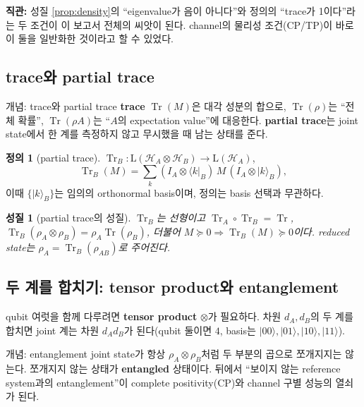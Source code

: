 \documentclass[11pt,a4paper]{article}
\newcommand{\Hcal}{\mathcal{H}}
\newcommand{\Tr}{\operatorname{Tr}}
\newcommand{\Lin}{\mathrm{L}}
\theoremstyle{definition}
\newtheorem{definition}{정의}[section]
\theoremstyle{plain}
\newtheorem{property}{성질}[section]
\theoremstyle{remark}
\begin{document}
\begin{intuitionbox}
\textbf{직관:} 성질 \ref{prop:density}의 ``eigenvalue가 음이 아니다''와 정의의 ``trace가 1이다''라는 두 조건이 이 보고서 전체의 씨앗이 된다. channel의 물리성 조건(CP/TP)이 바로 이 둘을 일반화한 것이라고 할 수 있었다.
\end{intuitionbox}

\subsection{trace와 partial trace}

\begin{conceptbox}{개념: trace와 partial trace}
\textbf{trace} $\Tr(M)$은 대각 성분의 합으로, $\Tr(\rho)$는 ``전체 확률'', $\Tr(\rho A)$는 ``$A$의 expectation value''에 대응한다. \textbf{partial trace}는 joint state에서 한 계를 측정하지 않고 무시했을 때 남는 상태를 준다.
\end{conceptbox}

\begin{definition}[partial trace]
$\Tr_B:\Lin(\Hcal_A\otimes\Hcal_B)\to\Lin(\Hcal_A)$,
\[
\Tr_B(M)=\sum_k(I_A\otimes\langle k|_B)\,M\,(I_A\otimes|k\rangle_B),
\]
이때 $\{|k\rangle_B\}$는 임의의 orthonormal basis이며, 정의는 basis 선택과 무관하다.
\end{definition}

\begin{property}[partial trace의 성질]\label{prop:ptrace}
$\Tr_B$는 선형이고 $\Tr_A\circ\Tr_B=\Tr$, $\Tr_B(\rho_A\otimes\rho_B)=\rho_A\Tr(\rho_B)$, 더불어 $M\succeq0\Rightarrow\Tr_B(M)\succeq0$이다. reduced state는 $\rho_A=\Tr_B(\rho_{AB})$로 주어진다.
\end{property}

\subsection{두 계를 합치기: tensor product와 entanglement}

qubit 여럿을 함께 다루려면 \textbf{tensor product} $\otimes$가 필요하다. 차원 $d_A,d_B$의 두 계를 합치면 joint 계는 차원 $d_Ad_B$가 된다(qubit 둘이면 $4$, basis는 $|00\rangle,|01\rangle,|10\rangle,|11\rangle$).

\begin{conceptbox}{개념: entanglement}
joint state가 항상 $\rho_A\otimes\rho_B$처럼 두 부분의 곱으로 쪼개지지는 않는다. 쪼개지지 않는 상태가 \textbf{entangled} 상태이다. 뒤에서 ``보이지 않는 reference system과의 entanglement''이 complete positivity(CP)와 channel 구별 성능의 열쇠가 된다.
\end{conceptbox}
\end{document}
